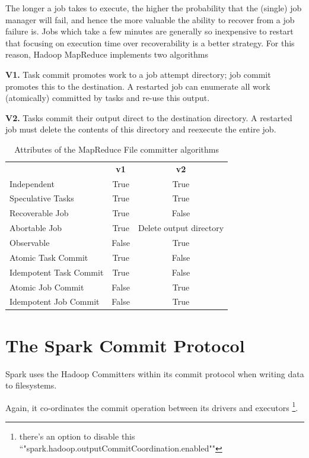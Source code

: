 \documentclass[9pt,technote]{IEEEtran}
\begin{document}
The longer a job takes to execute, the higher the probability that the (single)
job manager will fail, and hence the more valuable the ability to recover from
a job failure is.
Jobs which take a few minutes are generally so inexpensive to
restart that focusing on execution time over recoverability is a better strategy.
For this reason, Hadoop MapReduce implements two algorithms


\textbf{V1.}
Task commit promotes work to a job attempt directory;
job commit promotes this to the destination.
A restarted job can enumerate all work (atomically)
committed by tasks and re-use this output.

\textbf{V2.}
Tasks commit their output direct to the destination directory.
A restarted job must delete the contents of this directory and reexecute
the entire job.

\begin{table}
  \label{tab:file-committer-attributes}
  \begin{tabular}{ l c c }
    \hline
    & \textbf{v1} & \textbf{v2} \\
    Independent & True & True \\
    Speculative Tasks & True & True \\
    Recoverable Job & True & False \\
    Abortable Job & True & Delete output directory \\
    Observable & False & True \\
    Atomic Task Commit & True & False \\
    Idempotent Task Commit & True & False \\
    Atomic Job Commit & False & True \\
    Idempotent Job Commit & False & True \\
    \hline
  \end{tabular}
  \caption{Attributes of the MapReduce File committer algorithms}
\end{table}

\section{The Spark Commit Protocol}

Spark uses the Hadoop Committers within its commit protocol when
writing data to filesystems.

Again, it co-ordinates the commit operation between its drivers and executors
\footnote{there's an option to disable this ``"spark.hadoop.outputCommitCoordination.enabled""}.
\end{document}
